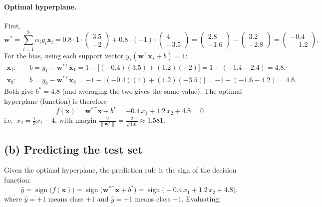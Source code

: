 \documentclass[11pt]{article}
\newcommand{\bx}{\mathbf{x}}
\newcommand{\bw}{\mathbf{w}}
\begin{document}
\paragraph{Optimal hyperplane.} First,
\[
\bw^*=\sum_{i=1}^{8}\alpha_i y_i\bx_i
=0.8\cdot 1\cdot\begin{pmatrix}3.5\\-2\end{pmatrix}
+0.8\cdot(-1)\cdot\begin{pmatrix}4\\-3.5\end{pmatrix}
=\begin{pmatrix}2.8\\-1.6\end{pmatrix}
-\begin{pmatrix}3.2\\-2.8\end{pmatrix}
=\boxed{\begin{pmatrix}-0.4\\ \phantom{-}1.2\end{pmatrix}}.
\]
For the bias, using each support vector $y_s(\bw^{\top}\bx_s+b)=1$:
\begin{align*}
\bx_1:\quad & b= y_1-\bw^{*\top}\bx_1
 = 1-\bigl[(-0.4)(3.5)+(1.2)(-2)\bigr]
 = 1-(-1.4-2.4)=4.8,\\
\bx_8:\quad & b= y_8-\bw^{*\top}\bx_8
 = -1-\bigl[(-0.4)(4)+(1.2)(-3.5)\bigr]
 = -1-(-1.6-4.2)=4.8 .
\end{align*}
Both give $b^*=4.8$ (and averaging the two gives the same value). The optimal hyperplane
(function) is therefore
\[
\boxed{\ f(\bx)=\bw^{*\top}\bx+b^*=-0.4\,x_1+1.2\,x_2+4.8=0\ }
\]
i.e.\ $x_2=\tfrac{1}{3}x_1-4$, with margin $\tfrac{2}{\|\bw^*\|}=\tfrac{2}{\sqrt{1.6}}\approx 1.581$.

\subsection*{(b) Predicting the test set}

Given the optimal hyperplane, the prediction rule is the sign of the decision function:
\[
\hat y=\operatorname{sign}\bigl(f(\bx)\bigr)
=\operatorname{sign}\bigl(\bw^{*\top}\bx+b^*\bigr)
=\operatorname{sign}\bigl(-0.4\,x_1+1.2\,x_2+4.8\bigr),
\]
where $\hat y=+1$ means class $+1$ and $\hat y=-1$ means class $-1$. Evaluating:
\end{document}
